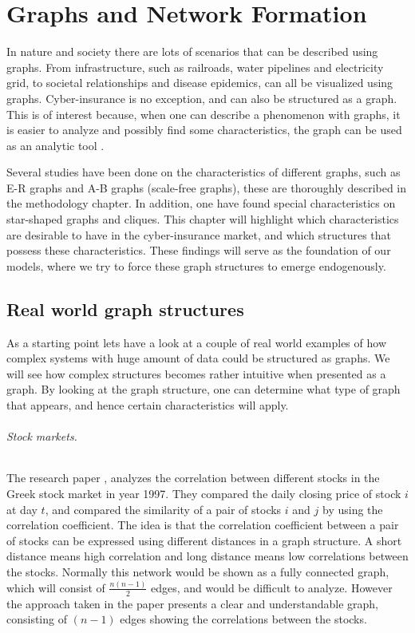 \chapter{Graphs and Network Formation}
\label{chp:graphTheory} 

In nature and society there are lots of scenarios that can be described using graphs. From infrastructure, such as railroads, water pipelines and electricity grid, to societal relationships and disease epidemics, can all be visualized using graphs. Cyber-insurance is no exception, and can also be structured as a graph. This is of interest because, when one can describe a phenomenon with graphs, it is easier to analyze and possibly find some characteristics, the graph can be used as an analytic tool \cite{audestad}. 

Several studies have been done on the characteristics of different graphs, such as E-R graphs and A-B graphs (scale-free graphs), these are thoroughly described in the methodology chapter. In addition, one have found special characteristics on star-shaped graphs and cliques. This chapter will highlight which characteristics are desirable to have in the cyber-insurance market, and which structures that possess these characteristics. These findings will serve as the foundation of our models, where we try to force these graph structures to emerge endogenously. 
 
\section{Real world graph structures}
As a starting point lets have a look at a couple of real world examples of how complex systems with huge amount of data could be structured as graphs. We will see how complex structures becomes rather intuitive when presented as a graph. By looking at the graph structure, one can determine what type of graph that appears, and hence certain characteristics will apply.  

\subparagraph{Stock markets.} The research paper \cite{greekStockMarket}, analyzes the correlation between different stocks in the Greek stock market in year 1997. They compared the daily closing price of stock $i$ at day $t$, and compared the similarity of a pair of stocks $i$ and $j$ by using the correlation coefficient. The idea is that the correlation coefficient between a pair of stocks can be expressed using different distances in a graph structure. A short distance means high correlation and long distance means low correlations between the stocks. Normally this network would be shown as a fully connected graph, which will consist of $\frac{n(n-1)}{2}$ edges, and would be difficult to analyze. However the approach taken in the paper presents a clear and understandable graph, consisting of $(n-1)$ edges showing the correlations between the stocks.

